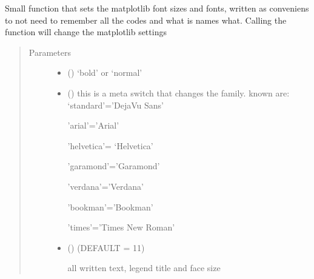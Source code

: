 \documentclass[letterpaper,10pt,english]{sphinxmanual}
\begin{document}
\begin{fulllineitems}
\label{\detokenize{plot_func:plot_func.changefonts}}
Small function that sets the matplotlib font sizes and fonts, written as conveniens to not need to remember all the
codes and what is names what. Calling the function will change the matplotlib  settings
\begin{quote}\begin{description}
\item[{Parameters}] \leavevmode\begin{itemize}
\item {} 
 (\sphinxstyleliteralemphasis{\sphinxupquote{, }}) \textendash{} ‘bold’ or  ‘normal’

\item {} 
 (\sphinxstyleliteralemphasis{\sphinxupquote{, }}) \textendash{} 
this is a meta switch that changes the family. known are:
‘standard’=’DejaVu Sans’

’arial’=’Arial’

’helvetica’= ‘Helvetica’

’garamond’=’Garamond’

’verdana’=’Verdana’

’bookman’=’Bookman’

’times’=’Times New Roman’


\item {} 
 (\sphinxstyleliteralemphasis{\sphinxupquote{, }}) \textendash{} 
(DEFAULT = 11)

all written text, legend title and face size



\end{itemize}
\end{description}
\end{quote}
\end{fulllineitems}
\end{document}
